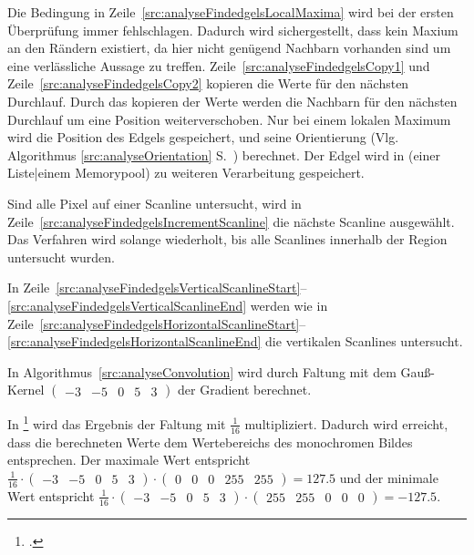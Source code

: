 Die Bedingung in Zeile~\ref{src:analyseFindedgelsLocalMaxima} wird bei der ersten Überprüfung immer fehlschlagen.
 Dadurch wird sichergestellt, dass kein Maxium an den Rändern existiert, da hier nicht genügend Nachbarn vorhanden sind
 um eine verlässliche Aussage zu treffen. Zeile~\ref{src:analyseFindedgelsCopy1} und
 Zeile~\ref{src:analyseFindedgelsCopy2} kopieren die Werte für den nächsten Durchlauf. Durch das kopieren der Werte
 werden die Nachbarn für den nächsten Durchlauf um eine Position weiterverschoben. Nur bei einem lokalen Maximum wird
 die Position des Edgels gespeichert, und seine Orientierung (Vlg. Algorithmus \ref{src:analyseOrientation}
 S.~\pageref{src:analyseOrientation}) berechnet. Der Edgel wird in (einer Liste|einem Memorypool) zu weiteren
 Verarbeitung gespeichert.

Sind alle Pixel auf einer Scanline untersucht, wird in Zeile~\ref{src:analyseFindedgelsIncrementScanline} die nächste
 Scanline ausgewählt. Das Verfahren wird solange wiederholt, bis alle Scanlines innerhalb der Region untersucht wurden.

In Zeile~\ref{src:analyseFindedgelsVerticalScanlineStart}--\ref{src:analyseFindedgelsVerticalScanlineEnd} werden wie in
 Zeile~\ref{src:analyseFindedgelsHorizontalScanlineStart}--\ref{src:analyseFindedgelsHorizontalScanlineEnd} die
 vertikalen Scanlines untersucht.


In Algorithmus~\autoref{src:analyseConvolution} wird durch Faltung mit dem Gauß-Kernel
$\left( \begin{smallmatrix}
-3& -5& 0& 5& 3
\end{smallmatrix} \right)$
der Gradient berechnet.



In \citeauthor{clarke96}\footcite[Vgl.][S.~417]{clarke96} wird das Ergebnis der Faltung mit $\tfrac{1}{16}$
 multipliziert. Dadurch wird erreicht, dass die berechneten Werte dem Wertebereichs des monochromen Bildes entsprechen.
 Der maximale Wert entspricht
$\tfrac{1}{16}
\cdot
\left( \begin{smallmatrix}
	-3& -5& 0& 5& 3
\end{smallmatrix} \right)
\cdot
\left( \begin{smallmatrix}
	0& 0& 0& 255& 255
\end{smallmatrix} \right)
= 127.5
$
und der minimale Wert entspricht
$\tfrac{1}{16}
\cdot
\left( \begin{smallmatrix}
	-3& -5& 0& 5& 3
\end{smallmatrix} \right)
\cdot
\left( \begin{smallmatrix}
	255& 255& 0& 0& 0
\end{smallmatrix} \right)
= -127.5 \text{.}
$





